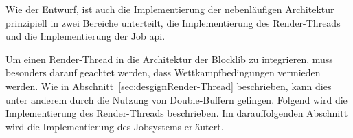 Wie der Entwurf, ist auch die Implementierung der nebenläufigen Architektur prinzipiell in zwei Bereiche unterteilt, die Implementierung des Render-Threads und die Implementierung der Job \acs{api}.

Um einen Render-Thread in die Architektur der Blocklib zu integrieren, muss besonders darauf geachtet werden, dass Wettkampfbedingungen vermieden werden. Wie in Abschnitt~\ref{sec:desgignRender-Thread} beschrieben, kann dies unter anderem durch die Nutzung von Double-Buffern gelingen. Folgend wird die Implementierung des Render-Threads beschrieben. Im darauffolgenden Abschnitt wird die Implementierung des Jobsystems erläutert.